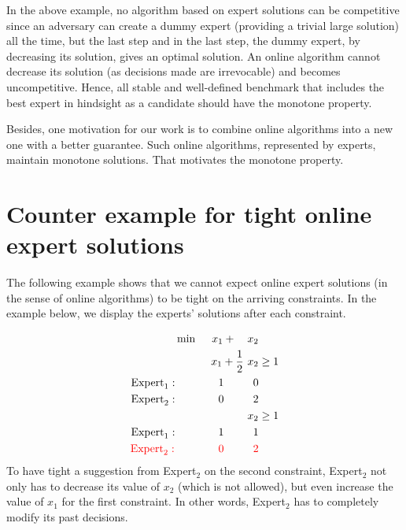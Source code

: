 In the above example, no algorithm based on expert solutions can be competitive 
since an adversary can create a dummy expert (providing a trivial large solution) all the time, but the last step 
and in the last step, the dummy expert, by decreasing its solution, gives an optimal solution. 
An online algorithm cannot decrease its solution (as decisions made are irrevocable)
and becomes uncompetitive. Hence, all stable and well-defined benchmark that includes the best expert in hindsight as a candidate should have the monotone property. 

Besides, one motivation for our work is to combine online algorithms into a new one with a better guarantee. 
Such online algorithms, represented by experts, maintain monotone solutions. That motivates the monotone property.  

\section{Counter example for tight online expert solutions} \label{appix-tight-solutions}

The following example shows that we cannot expect online expert solutions (in the sense of online algorithms)
to be tight on the arriving constraints. In the example below, we display the experts' solutions after each constraint.

\begin{align*}
    \min\ \ \ \ x_{1} + \ \ \ x_{2} & \\
    x_{1} + \frac{1}{2}\ x_{2} & \ge 1 \\
    \textnormal{Expert}_{1}: \ \ \ \ \ \ \ \ \ \ \ 1 \ \ \ \ \ \ \ \ 0 & \\
    \textnormal{Expert}_{2}: \ \ \ \ \ \ \ \ \ \ \ 0 \ \ \ \ \ \ \ \ 2 & \\
    x_{2} & \ge 1 \\
    \textnormal{Expert}_{1}: \ \ \ \ \ \ \ \ \ \ \ 1 \ \ \ \ \ \ \ \ 1 & \\
    {\color{red}\textnormal{Expert}_{2}:} \ \ \ \ \ \ \ \ \ \ \ \ {\color{red} 0} \ \ \ \ \ \ \ \ {\color{red} 2} & \\
\end{align*}
%
To have tight a suggestion from Expert$_2$ on the second constraint, Expert$_2$ not only has to decrease its value of $x_{2}$ (which is not allowed), but even increase the value of $x_{1}$ for the first constraint. In other words, Expert$_2$ has to completely modify its past decisions.
